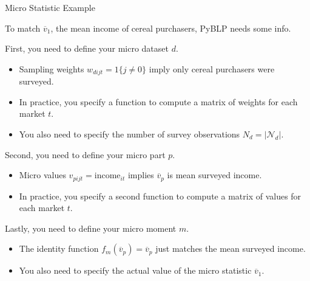 \documentclass[aspectratio=169,t,11pt,table]{beamer}
\begin{document}
\begin{frame}{Micro Statistic Example}
    \begin{wideitemize}
        \item To match $\overline{v}_1$, the mean income of cereal purchasers, PyBLP needs some info.
        \pause
        \item First, you need to define your \alert{micro dataset} $d$.
        \begin{itemize}
            \item Sampling weights $w_{dijt} = 1\{j \neq 0\}$ imply only cereal purchasers were surveyed.
            \item In practice, you specify a function to compute a matrix of weights for each market $t$.
            \item You also need to specify the number of survey observations $N_d = |\mathcal{N}_d|$.
        \end{itemize}
        \pause
        \item Second, you need to define your \alert{micro part} $p$.
        \begin{itemize}
            \item Micro values $v_{pijt} = \text{income}_{it}$ implies $\overline{v}_p$ is mean surveyed income.
            \item In practice, you specify a second function to compute a matrix of values for each market $t$.
        \end{itemize}
        \pause
        \item Lastly, you need to define your \alert{micro moment} $m$.
        \begin{itemize}
            \item The identity function $f_m(\overline{v}_p) = \overline{v}_p$ just matches the mean surveyed income.
            \item You also need to specify the actual value of the micro statistic $\overline{v}_1$.
        \end{itemize}
    \end{wideitemize}
\end{frame}
\end{document}
